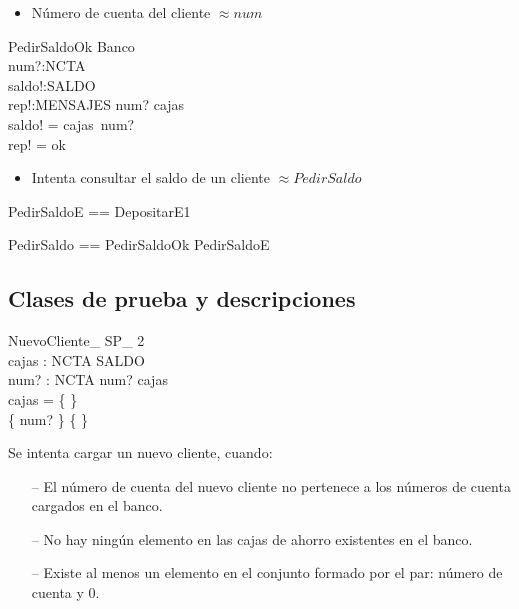 \begin{itemize}
  \item Número de cuenta del cliente $\approx num$ \\
\end{itemize}

\begin{schema}{PedirSaldoOk}
\Xi Banco \\
num?:NCTA \\
saldo!:SALDO \\
rep!:MENSAJES
\where
num? \in \dom cajas \\
saldo! = cajas~num? \\
rep! = ok
\end{schema}

\begin{itemize}
  \item Intenta consultar el saldo de un cliente $\approx PedirSaldo$ \\
\end{itemize}

\begin{zed}
PedirSaldoE == DepositarE1 \also

PedirSaldo == PedirSaldoOk \lor PedirSaldoE
\end{zed}

\subsection*{Clases de prueba y descripciones}

\begin{schema}{NuevoCliente\_ SP\_ 2}\\
 cajas : NCTA \pfun SALDO \\
 num? : NCTA 
\where
 num? \notin \dom cajas \\
 cajas = \{ \} \\
 \{ num?  \} \neq \{ \}
\end{schema}

\begin{tcolorbox}[colback=gray!5!white,colframe=gray!50!black,
  colbacktitle=gray!75!black,title=NuevoCliente\_SP\_2]
  Se intenta cargar un nuevo cliente, cuando:
     \begin{itemize}
        \item[--]{El número de cuenta del nuevo cliente no pertenece a los números de cuenta cargados en el banco.}
        \item[--]{No hay ningún elemento en las cajas de ahorro existentes en el banco.}
        \item[--]{Existe al menos un elemento en el conjunto formado por el par: número de cuenta y 0.}
     \end{itemize}
\end{tcolorbox}


